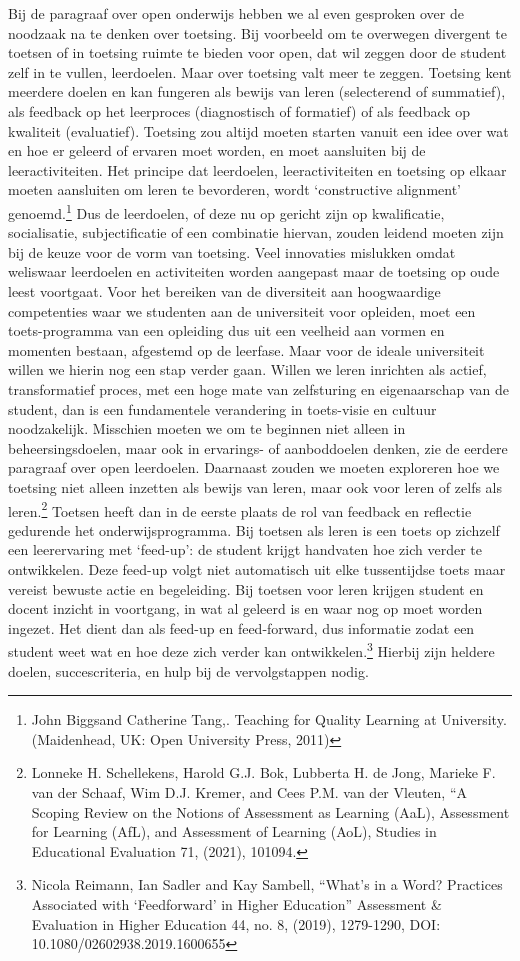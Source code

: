 \documentclass{jote-book}
\begin{document}
	Bij de paragraaf over open onderwijs hebben we al even gesproken over de noodzaak na te denken over toetsing. Bij voorbeeld om te overwegen divergent te toetsen of in toetsing ruimte te bieden voor open, dat wil zeggen door de student zelf in te vullen, leerdoelen. Maar over toetsing valt meer te zeggen. Toetsing kent meerdere doelen en kan fungeren als bewijs van leren (selecterend of summatief), als feedback op het leerproces (diagnostisch of formatief) of als feedback op kwaliteit (evaluatief). Toetsing zou altijd moeten starten vanuit een idee over wat en hoe er geleerd of ervaren moet worden, en moet aansluiten bij de leeractiviteiten. Het principe dat leerdoelen, leeractiviteiten en toetsing op elkaar moeten aansluiten om leren te bevorderen, wordt ‘constructive alignment' genoemd.\footnote{John Biggsand Catherine Tang,. Teaching for Quality Learning at University. (Maidenhead, UK: Open University Press, 2011)} Dus de leerdoelen, of deze nu op gericht zijn op kwalificatie, socialisatie, subjectificatie of een combinatie hiervan, zouden leidend moeten zijn bij de keuze voor de vorm van toetsing. Veel innovaties mislukken omdat weliswaar leerdoelen en activiteiten worden aangepast maar de toetsing op oude leest voortgaat. Voor het bereiken van de diversiteit aan hoogwaardige competenties waar we studenten aan de universiteit voor opleiden, moet een toets-programma van een opleiding dus uit een veelheid aan vormen en momenten bestaan, afgestemd op de leerfase. Maar voor de ideale universiteit willen we hierin nog een stap verder gaan. Willen we leren inrichten als actief, transformatief proces, met een hoge mate van zelfsturing en eigenaarschap van de student, dan is een fundamentele verandering in toets-visie en cultuur noodzakelijk. Misschien moeten we om te beginnen niet alleen in beheersingsdoelen, maar ook in ervarings- of aanboddoelen denken, zie de eerdere paragraaf over open leerdoelen. Daarnaast zouden we moeten exploreren hoe we toetsing niet alleen inzetten als bewijs van leren, maar ook voor leren of zelfs als leren.\footnote{Lonneke H. Schellekens, Harold G.J. Bok, Lubberta H. de Jong, Marieke F. van der Schaaf, Wim D.J. Kremer, and Cees P.M. van der Vleuten, “A Scoping Review on the Notions of Assessment as Learning (AaL), Assessment for Learning (AfL), and Assessment of Learning (AoL), Studies in Educational Evaluation 71, (2021), 101094.} Toetsen heeft dan in de eerste plaats de rol van feedback en reflectie gedurende het onderwijsprogramma. Bij toetsen als leren is een toets op zichzelf een leerervaring met ‘feed-up': de student krijgt handvaten hoe zich verder te ontwikkelen. Deze feed-up volgt niet automatisch uit elke tussentijdse toets maar vereist bewuste actie en begeleiding. Bij toetsen voor leren krijgen student en docent inzicht in voortgang, in wat al geleerd is en waar nog op moet worden ingezet. Het dient dan als feed-up en feed-forward, dus informatie zodat een student weet wat en hoe deze zich verder kan ontwikkelen.\footnote{Nicola Reimann, Ian Sadler and Kay Sambell, “What's in a Word? Practices Associated with ‘Feedforward' in Higher Education” Assessment \& Evaluation in Higher Education 44, no. 8, (2019), 1279-1290, DOI: 10.1080/02602938.2019.1600655} Hierbij zijn heldere doelen, succescriteria, en hulp bij de vervolgstappen nodig. 
\end{document}
